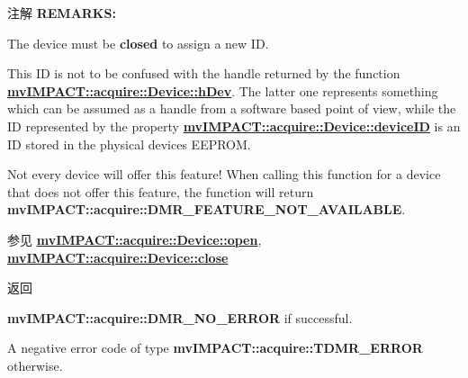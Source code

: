 \begin{DoxyNote}{注解}
{\bfseries R\+E\+M\+A\+R\+K\+S\+:} 


\begin{DoxyItemize}
\item The device must be {\bfseries closed} to assign a new I\+D.
\item This I\+D is not to be confused with the handle returned by the function {\bfseries \hyperlink{classmv_i_m_p_a_c_t_1_1acquire_1_1_device_a73fb3a8ac92b197700f04e1df9c250e7}{mv\+I\+M\+P\+A\+C\+T\+::acquire\+::\+Device\+::h\+Dev}}. The latter one represents something which can be assumed as a handle from a software based point of view, while the I\+D represented by the property {\bfseries \hyperlink{classmv_i_m_p_a_c_t_1_1acquire_1_1_device_a239e7c6f214d441015ef15e4cbde83ca}{mv\+I\+M\+P\+A\+C\+T\+::acquire\+::\+Device\+::device\+I\+D}} is an I\+D stored in the physical devices E\+E\+P\+R\+O\+M.
\item Not every device will offer this feature! When calling this function for a device that does not offer this feature, the function will return {\bfseries mv\+I\+M\+P\+A\+C\+T\+::acquire\+::\+D\+M\+R\+\_\+\+F\+E\+A\+T\+U\+R\+E\+\_\+\+N\+O\+T\+\_\+\+A\+V\+A\+I\+L\+A\+B\+L\+E}.
\end{DoxyItemize}
\end{DoxyNote}
\begin{DoxySeeAlso}{参见}
{\bfseries \hyperlink{classmv_i_m_p_a_c_t_1_1acquire_1_1_device_adf4cb4c232b202a51c7161caf9b36165}{mv\+I\+M\+P\+A\+C\+T\+::acquire\+::\+Device\+::open}}, ~\newline
 {\bfseries \hyperlink{classmv_i_m_p_a_c_t_1_1acquire_1_1_device_a00da7acbf28c1591163682b7bdf611a4}{mv\+I\+M\+P\+A\+C\+T\+::acquire\+::\+Device\+::close}} 
\end{DoxySeeAlso}
\begin{DoxyReturn}{返回}

\begin{DoxyItemize}
\item {\bfseries mv\+I\+M\+P\+A\+C\+T\+::acquire\+::\+D\+M\+R\+\_\+\+N\+O\+\_\+\+E\+R\+R\+O\+R} if successful.
\item A negative error code of type {\bfseries mv\+I\+M\+P\+A\+C\+T\+::acquire\+::\+T\+D\+M\+R\+\_\+\+E\+R\+R\+O\+R} otherwise. 
\end{DoxyItemize}
\end{DoxyReturn}

